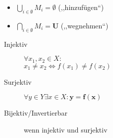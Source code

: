 \documentclass[uniLeipzig]{merkzettel}
\begin{document}
\begin{mzImportant}
  \begin{itemize}
    \item $\bigcup_{i \in \emptyset} M_i = \boldsymbol{\emptyset}$ (,,hinzufügen``)

    \item $\bigcap_{i \in \emptyset} M_i = \boldsymbol{U}$ (,,wegnehmen``)
  \end{itemize}
\end{mzImportant}

\begin{mzImportant}
  \begin{description}
    \item [Injektiv]
          $\forall x_1, x_2 \in X:$ \\
          $x_1 \boldsymbol{\neq} x_2 \Leftrightarrow f(x_1) \boldsymbol{\neq} f(x_2)$

    \item [Surjektiv]
          $\forall y \in Y \exists x \in X: \mathbf{y = f(x)}$

    \item [Bijektiv/Invertierbar]
          wenn injektiv und surjektiv
  \end{description}
\end{mzImportant}
\end{document}
